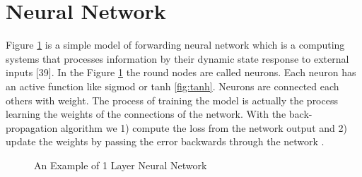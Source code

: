 \section{Neural Network} %
Figure \ref{fig:NN} is a simple model of forwarding neural network which is a computing systems that processes information by their dynamic state response to external inputs [39]. In the Figure  \ref{fig:NN}  
the round nodes are called neurons. Each neuron has an active function like sigmod or tanh \ref{fig:tanh}. Neurons are connected each others with weight. The process of training the model is actually the process learning the weights of the connections of the network. With the back-propagation algorithm we 1) compute the loss from the network
output and 2) update the weights by passing the error
backwards through the network \cite{rumelhart1988learning}.  
\begin{figure}[!h]
\center
\def\layersep{2.5cm}


   \caption{An Example of 1 Layer Neural Network}
\label{fig:NN}
\end{figure}
\label{sec:NNsec}

